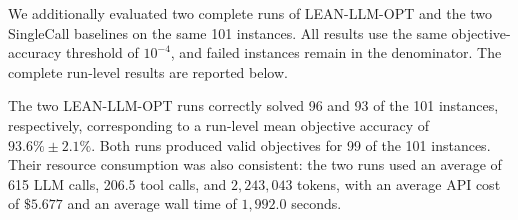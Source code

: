 \documentclass[11pt]{article}
\begin{document}
\begin{enumerate}[label=(AssoE.\arabic*),leftmargin=*]
\begin{enumerate}[label=(R2.Major.\arabic*),leftmargin=*]
We additionally evaluated two complete runs of LEAN-LLM-OPT and the two
SingleCall baselines on the same 101 instances. All results use the same
objective-accuracy threshold of $10^{-4}$, and failed instances remain in the
denominator. The complete run-level results are reported below.

\begin{table}[!htbp]
\centering
\caption{Run-level objective accuracy and resource consumption on the
101-instance Large-Scale-OR benchmark.}
\label{tab:lsor-complete-runs-response}
\small
\setlength{\tabcolsep}{3.5pt}
\renewcommand{\arraystretch}{1.25}
\end{table}

The two LEAN-LLM-OPT runs correctly solved 96 and 93 of the 101 instances,
respectively, corresponding to a run-level mean objective accuracy of
$93.6\%\pm2.1\%$. Both runs produced valid objectives for 99 of the 101
instances. Their resource consumption was also consistent: the two runs used
an average of 615 LLM calls, 206.5 tool calls, and $2{,}243{,}043$ tokens,
with an average API cost of $\$5.677$ and an average wall time of
$1{,}992.0$ seconds.



\end{enumerate}
\end{enumerate}
\end{document}
